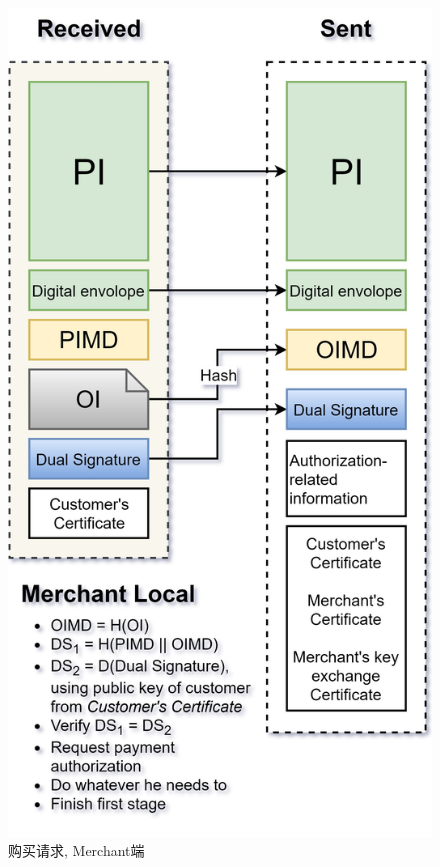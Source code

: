 \documentclass{ctexart}
\begin{document}
    \begin{figure}[ht!]
    \centering
    \includegraphics[height=\textheight, width=\textwidth, keepaspectratio]{set-2.jpg}
    \caption{购买请求, Merchant端}
    \label{set-2}
    \end{figure}
\end{document}
